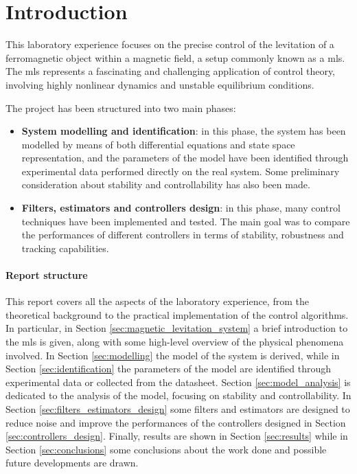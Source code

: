 \section{Introduction}
\label{sec:introduction}

This laboratory experience focuses on the precise control of the levitation of a ferromagnetic object within a magnetic field, a setup commonly known as a \acrfull{mls}.
The \acrshort{mls} represents a fascinating and challenging application of control theory, involving highly nonlinear dynamics and unstable equilibrium conditions.

The project has been structured into two main phases:

\begin{itemize}
    \item \textbf{System modelling and identification}: in this phase, the system has been modelled by means of both differential equations and state space representation, and the parameters of the model have been identified through experimental data performed directly on the real system. Some preliminary consideration about stability and controllability has also been made.
    \item \textbf{Filters, estimators and controllers design}: in this phase, many control techniques have been implemented and tested. The main goal was to compare the performances of different controllers in terms of stability, robustness and tracking capabilities.
\end{itemize}

\paragraph{Report structure}

This report covers all the aspects of the laboratory experience, from the theoretical background to the practical implementation of the control algorithms.
In particular, in Section \ref{sec:magnetic_levitation_system} a brief introduction to the \acrshort{mls} is given, along with some high-level overview of the physical phenomena involved.
In Section \ref{sec:modelling} the model of the system is derived, while in Section \ref{sec:identification} the parameters of the model are identified through experimental data or collected from the datasheet.
Section \ref{sec:model_analysis} is dedicated to the analysis of the model, focusing on stability and controllability.
In Section \ref{sec:filters_estimators_design} some filters and estimators are designed to reduce noise and improve the performances of the controllers designed in Section \ref{sec:controllers_design}.
Finally, results are shown in Section \ref{sec:results} while in Section \ref{sec:conclusions} some conclusions about the work done and possible future developments are drawn.

